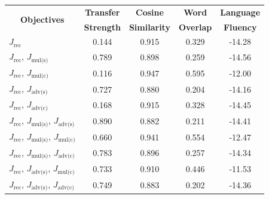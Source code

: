 \documentclass[letterpaper]{article} %
\newcommand{\tabh}[1]{\multicolumn{1}{c|}{\textbf{#1}}}
\newcommand{\tabc}[2]{\multicolumn{1}{|c||}{\multirow{#1}{*}{\textbf{#2}}}}
\newcommand{\loss}[1]{J_{\text{#1}}}
\begin{document}
\begin{table}[ht]
	\centering
	\begin{tabular}{| l || c | c | c | c |}
		\hline
		\tabc{2}{Objectives}                                                             & \tabh{Transfer} & \tabh{Cosine}     & \tabh{Word}    & \tabh{Language} \\
		                                                                                 & \tabh{Strength} & \tabh{Similarity} & \tabh{Overlap} & \tabh{Fluency}  \\
		\hline
		\hline
		$\loss{rec}$                                                                     & 0.144           & 0.915             & 0.329          & -14.28          \\
		\hline
		$\loss{rec}$, $\loss{mul(s)}$                                                    & 0.789           & 0.898             & 0.259          & -14.56          \\
		\hline
		$\loss{rec}$, $\loss{mul(c)}$                                                    & 0.116           & 0.947             & 0.595          & -12.00          \\
		\hline
		$\loss{rec}$, $\loss{adv(s)}$                                                    & 0.727           & 0.880             & 0.204          & -14.16          \\
		\hline
		$\loss{rec}$, $\loss{adv(c)}$                                                    & 0.168           & 0.915             & 0.328          & -14.45          \\
		\hline
		$\loss{rec}$, $\loss{mul(s)}$, $\loss{adv(s)}$                                   & 0.890           & 0.882             & 0.211          & -14.41          \\
		\hline
		$\loss{rec}$, $\loss{mul(s)}$, $\loss{mul(c)}$                                   & 0.660           & 0.941             & 0.554          & -12.47          \\
		\hline
		$\loss{rec}$, $\loss{mul(s)}$, $\loss{adv(c)}$                                   & 0.783           & 0.896             & 0.257          & -14.34          \\
		\hline
		$\loss{rec}$, $\loss{adv(s)}$, $\loss{mul(c)}$                                   & 0.733           & 0.910             & 0.446          & -11.53          \\
		\hline
		$\loss{rec}$, $\loss{adv(s)}$, $\loss{adv(c)}$                                   & 0.749           & 0.883             & 0.202          & -14.36          \\

\end{tabular}
\end{table}
\end{document}
